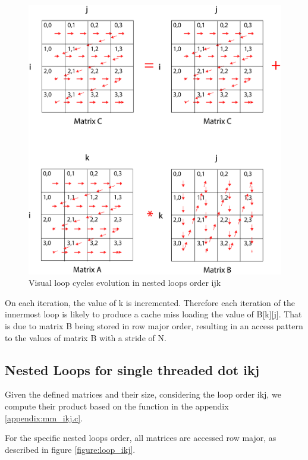 \documentclass{sigplanconf}
\begin{document}
\begin{figure}[H]
\centering
\includegraphics[width=0.9\columnwidth]{images/matrix_ijk_final.png}
\caption{Visual loop cycles evolution in nested loops order ijk}
\label{figure:loop_ijk}
\end{figure}

On each iteration, the value of k is incremented. Therefore each iteration of the innermost loop is likely to produce a cache miss loading the value of B[k][j]. That is due to matrix B being stored in row major order, resulting in an access pattern to the values of matrix B with a stride of N.\par 

\subsection{Nested Loops for single threaded dot ikj}

Given the defined matrices and their size, considering the loop order ikj, we compute their product based on the function in the appendix \ref{appendix:mm_ikj.c}.

For the specific nested loops order, all matrices are accessed row major, as described in figure \ref{figure:loop_ikj}.
\end{document}
